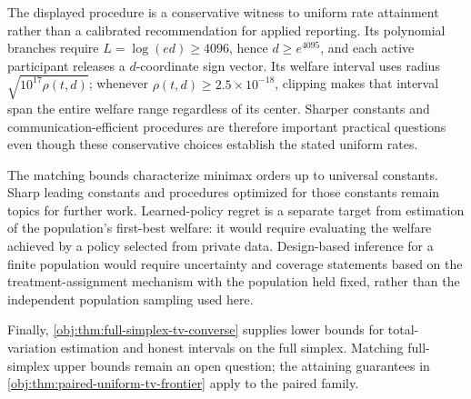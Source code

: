 The displayed procedure is a conservative witness to uniform rate attainment rather than a calibrated recommendation for applied reporting. Its polynomial branches require \(L=\log(ed)\ge4096\), hence \(d\ge e^{4095}\), and each active participant releases a \(d\)-coordinate sign vector. Its welfare interval uses radius \(\sqrt{10^{17}\rho(t,d)}\); whenever \(\rho(t,d)\ge2.5\times10^{-18}\), clipping makes that interval span the entire welfare range regardless of its center. Sharper constants and communication-efficient procedures are therefore important practical questions even though these conservative choices establish the stated uniform rates.

The matching bounds characterize minimax orders up to universal constants. Sharp leading constants and procedures optimized for those constants remain topics for further work. Learned-policy regret is a separate target from estimation of the population's first-best welfare: it would require evaluating the welfare achieved by a policy selected from private data. Design-based inference for a finite population would require uncertainty and coverage statements based on the treatment-assignment mechanism with the population held fixed, rather than the independent population sampling used here.

Finally, \cref{obj:thm:full-simplex-tv-converse} supplies lower bounds for total-variation estimation and honest intervals on the full simplex. Matching full-simplex upper bounds remain an open question; the attaining guarantees in \cref{obj:thm:paired-uniform-tv-frontier} apply to the paired family.
